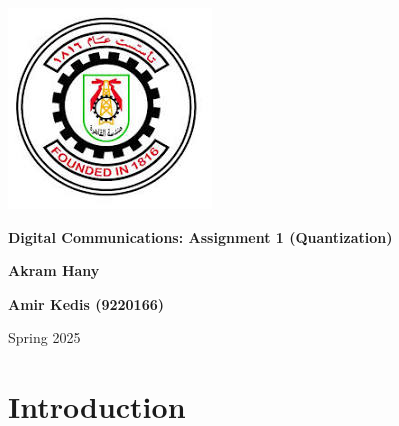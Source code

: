 \documentclass{article}
\begin{document}
\begin{titlepage}
\begin{center}
\begin{minipage}[c]{0.15\textwidth}
            \includegraphics[width=\textwidth]{CUFE.jpeg}
        \end{minipage}
    \end{center}
    
    \noindent\hrulefill
    
    \vspace{2cm}
    
    \begin{center}
        {\Huge \textbf{Digital Communications: Assignment 1 (Quantization)}\par}
        \vspace{1.5cm}
        {\Large \textbf{Akram Hany}\par}
        {\Large \textbf{Amir Kedis (9220166)}\par}
        \vspace{1cm}
        {\large Spring 2025\par}
    \end{center}
    
    \vfill
    
\end{titlepage}

\section{Introduction}
\end{document}
